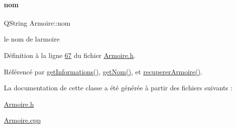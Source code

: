 \mbox{\label{class_armoire_a1de028da0fa3f085e2feaad8311d8795}} 
\paragraph{\texorpdfstring{nom}{nom}}
{\footnotesize\ttfamily Q\+String Armoire\+::nom\hspace{0.3cm}{\ttfamily [private]}}



le nom de l\textquotesingle{}armoire 



Définition à la ligne \hyperlink{_armoire_8h_source_l00067}{67} du fichier \hyperlink{_armoire_8h_source}{Armoire.\+h}.



Référencé par \hyperlink{_armoire_8cpp_source_l00078}{get\+Informations()}, \hyperlink{_armoire_8cpp_source_l00105}{get\+Nom()}, et \hyperlink{_armoire_8cpp_source_l00049}{recuperer\+Armoire()}.



La documentation de cette classe a été générée à partir des fichiers suivants \+:\begin{DoxyCompactItemize}
\item 
\hyperlink{_armoire_8h}{Armoire.\+h}\item 
\hyperlink{_armoire_8cpp}{Armoire.\+cpp}\end{DoxyCompactItemize}
